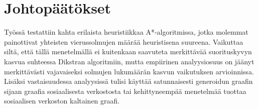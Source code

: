 \documentclass[10pt,a4paper]{article}
\begin{document}
\section{Johtopäätökset}

Työssä testattiin kahta erilaista heuristiikkaa A*-algoritmissa, jotka molemmat painottivat yhteisten vierussolmujen määrää heuristisena suureena. Vaikuttaa siltä, että tällä menetelmällä ei kuitenkaan saavuteta merkittävää suorituskyvyn kasvua suhteessa Dikstran algoritmiin, mutta empiirinen analyysiosuus on jäänyt merkittävästi vajavaiseksi solmujen lukumäärän kasvun vaikutuksen arvioinnissa. Lisäksi vastaisuudessa analyysissä tulisi käyttää satunnaisesti generoidun graafin sijaan graafia sosiaalisesta verkostosta tai kehittyneempää menetelmää tuottaa sosiaalisen verkoston kaltainen graafi.

 

\end{document}
